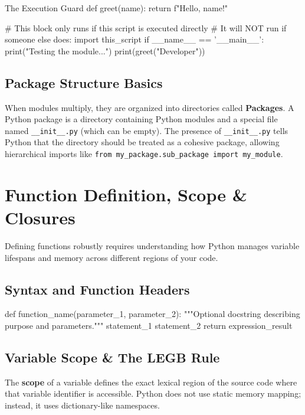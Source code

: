 \begin{pythoncode}{The Execution Guard}
def greet(name):
    return f"Hello, {name}!"

# This block only runs if this script is executed directly
# It will NOT run if someone else does: import this_script
if __name__ == '__main__':
    print("Testing the module...")
    print(greet("Developer"))
\end{pythoncode}

\subsection{Package Structure Basics}
When modules multiply, they are organized into directories called \textbf{Packages}. A Python package is a directory containing Python modules and a special file named \texttt{\_\_init\_\_.py} (which can be empty). The presence of \texttt{\_\_init\_\_.py} tells Python that the directory should be treated as a cohesive package, allowing hierarchical imports like \texttt{from my\_package.sub\_package import my\_module}.

\section{Function Definition, Scope \& Closures}

Defining functions robustly requires understanding how Python manages variable lifespans and memory across different regions of your code.

\subsection{Syntax and Function Headers}
\begin{syntaxbox}
def function\_name(parameter\_1, parameter\_2):
    """Optional docstring describing purpose and parameters."""
    statement\_1
    statement\_2
    return expression\_result
\end{syntaxbox}

\subsection{Variable Scope \& The LEGB Rule}
The \textbf{scope} of a variable defines the exact lexical region of the source code where that variable identifier is accessible. Python does not use static memory mapping; instead, it uses dictionary-like namespaces. 

